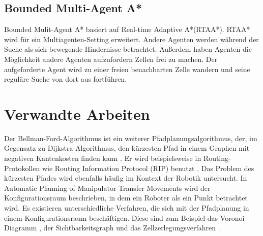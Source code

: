 \subsection{Bounded Multi-Agent A*}
Bounded Mulit-Agent A* basiert auf Real-time Adaptive A*(RTAA*). RTAA* wird für ein Multiagenten-Setting erweitert. Andere Agenten werden während der Suche als sich bewegende Hindernisse betrachtet. Außerdem haben Agenten die Möglichkeit andere Agenten aufzufordern Zellen frei zu machen. Der aufgeforderte Agent wird zu einer freien benachbarten Zelle wandern und seine reguläre Suche von dort aus fortführen\cite{Sigurdson.2019}.

\section{Verwandte Arbeiten}

\begin{sloppypar}
	
Der Bellman-Ford-Algorithmus ist ein weiterer Pfadplanungsalgorithmus, der, im Gegensatz zu Dijkstra-Algorithmus, den kürzesten Pfad in einem Graphen mit negativen Kantenkosten finden kann \cite{Bel58}. Er wird beispielsweise in Routing-Protokollen wie Routing Information Protocol (RIP) benutzt \cite{Hed88}.
Das Problem des kürzesten Pfades wird ebenfalls häufig im Kontext der Robotik untersucht. In Automatic Planning of Manipulator Transfer Movements \cite{LP80} wird der Konfigurationsraum beschrieben, in dem ein Roboter als ein Punkt betrachtet wird. Es existieren unterschiedliche Verfahren, die sich mit der Pfadplanung in einem Konfigurationsraum beschäftigen. Diese sind zum Beispiel das Voronoi-Diagramm \cite{Lee82}, der Sichtbarkeitsgraph \cite{LPAW79} und das Zellzerlegungsverfahren \cite{Cai09} .
\end{sloppypar}
